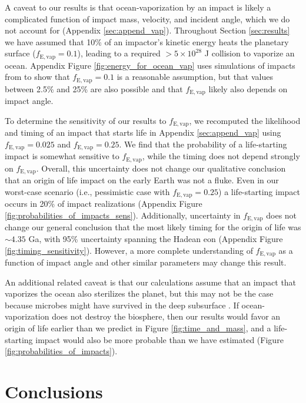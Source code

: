 \documentclass[manuscript]{aastex63}
\begin{document}
A caveat to our results is that ocean-vaporization by an impact is likely a complicated function of impact mass, velocity, and incident angle, which we do not account for (Appendix \ref{sec:append_vap}). Throughout Section \ref{sec:results} we have assumed that 10\% of an impactor's kinetic energy heats the planetary surface ($f_\mathrm{E,vap} = 0.1$), leading to a required $> 5 \times 10^{28}$ J collision to vaporize an ocean. Appendix Figure \ref{fig:energy_for_ocean_vap} uses simulations of impacts from \citet{Citron_2022} to show that $f_\mathrm{E,vap} = 0.1$ is a reasonable assumption, but that values between 2.5\% and 25\% are also possible and that $f_\mathrm{E,vap}$ likely also depends on impact angle.

To determine the sensitivity of our results to $f_\mathrm{E,vap}$, we recomputed the likelihood and timing of an impact that starts life in Appendix \ref{sec:append_vap} using $f_\mathrm{E,vap} = 0.025$ and $f_\mathrm{E,vap} = 0.25$. We find that the probability of a life-starting impact is somewhat sensitive to $f_\mathrm{E,vap}$, while the timing does not depend strongly on $f_\mathrm{E,vap}$. Overall, this uncertainty does not change our qualitative conclusion that an origin of life impact on the early Earth was not a fluke. Even in our worst-case scenario (i.e., \citet{Wogan_2023} pessimistic case with $f_\mathrm{E,vap} = 0.25$) a life-starting impact occurs in 20\% of impact realizations (Appendix Figure \ref{fig:probabilities_of_impacts_sens}). Additionally, uncertainty in $f_\mathrm{E,vap}$ does not change our general conclusion that the most likely timing for the origin of life was $\sim 4.35$ Ga, with 95\% uncertainty spanning the Hadean eon (Appendix Figure \ref{fig:timing_sensitivity}). However, a more complete understanding of $f_\mathrm{E,vap}$ as a function of impact angle and other similar parameters may change this result.

An additional related caveat is that our calculations assume that an impact that vaporizes the ocean also sterilizes the planet, but this may not be the case because microbes might have survived in the deep subsurface \citep{Sleep_1989,Grimm_2018}. If ocean-vaporization does not destroy the biosphere, then our results would favor an origin of life earlier than we predict in Figure \ref{fig:time_and_mass}, and a life-starting impact would also be more probable than we have estimated (Figure \ref{fig:probabilities_of_impacts}).

\section{Conclusions}
\end{document}
